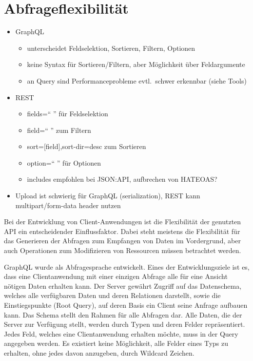 \section{Abfrageflexibilität}
\begin{itemize}
  \item GraphQL
  \begin{itemize}
    \item unterscheidet Feldselektion, Sortieren, Filtern, Optionen
    \item keine Syntax für Sortieren/Filtern, aber Möglichkeit über Feldargumente
    \item an Query sind Performanceprobleme evtl.\ schwer erkennbar (siehe Tools)
  \end{itemize}
  \item REST
  \begin{itemize}
    \item fields=`` '' für Feldselektion
    \item field=`` '' zum Filtern
    \item sort=[field],sort-dir=desc zum Sortieren
    \item option=`` '' für Optionen
    \item includes empfohlen bei JSON:API, aufbrechen von HATEOAS\@?
  \end{itemize}
  \item Upload ist schwierig für GraphQL (serialization), REST kann multipart/form-data header nutzen
\end{itemize}
Bei der Entwicklung von Client-Anwendungen ist die Flexibilität der genutzten API ein entscheidender Einflussfaktor.
Dabei steht meistens die Flexibilität für das Generieren der Abfragen zum Empfangen von Daten im Vordergrund, aber auch Operationen zum Modifizieren von Ressourcen müssen betrachtet werden.
\par
GraphQL wurde als Abfragesprache entwickelt.
Eines der Entwicklungsziele ist es, dass eine Clientanwendung mit einer einzigen Abfrage alle für eine Ansicht nötigen Daten erhalten kann.
Der Server gewährt Zugriff auf das Datenschema, welches alle verfügbaren Daten und deren Relationen darstellt, sowie die Einstiegspunkte (Root Query), auf deren Basis ein Client seine Anfrage aufbauen kann.
Das Schema stellt den Rahmen für alle Abfragen dar.
Alle Daten, die der Server zur Verfügung stellt, werden durch Typen und deren Felder repräsentiert.
Jedes Feld, welches eine Clientanwendung erhalten möchte, muss in der Query angegeben werden.
Es existiert keine Möglichkeit, alle Felder eines Typs zu erhalten, ohne jedes davon anzugeben, \zB{} durch Wildcard Zeichen.
